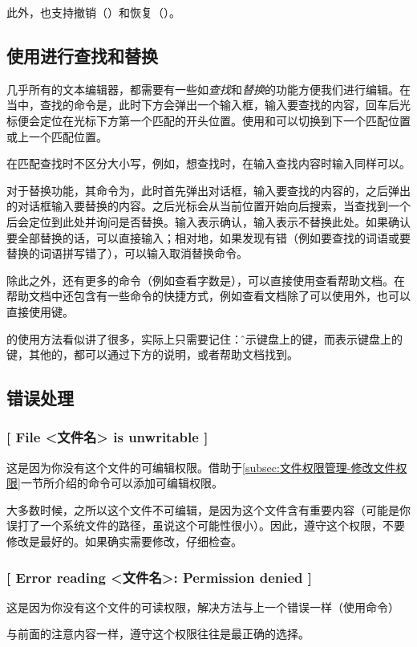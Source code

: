 此外，也支持撤销（）和恢复（）。

\subsection{使用进行查找和替换}

几乎所有的文本编辑器，都需要有一些如\emph{查找}和\emph{替换}的功能方便我们进行编辑。在当中，查找的命令是，此时下方会弹出一个输入框，输入要查找的内容，回车后光标便会定位在光标下方第一个匹配的开头位置。使用和可以切换到下一个匹配位置或上一个匹配位置。

\begin{attention}
    在匹配查找时不区分大小写，例如，想查找时，在输入查找内容时输入同样可以。
\end{attention}

对于替换功能，其命令为，此时首先弹出对话框，输入要查找的内容的，之后弹出的对话框输入要替换的内容。之后光标会从当前位置开始向后搜索，当查找到一个后会定位到此处并询问是否替换。输入表示确认，输入表示不替换此处。如果确认要全部替换的话，可以直接输入；相对地，如果发现有错（例如要查找的词语或要替换的词语拼写错了），可以输入取消替换命令。

除此之外，还有更多的命令（例如查看字数是），可以直接使用查看帮助文档。在帮助文档中还包含有一些命令的快捷方式，例如查看文档除了可以使用外，也可以直接使用键。

\begin{attention}
    的使用方法看似讲了很多，实际上只需要记住：\^表示键盘上的键，而表示键盘上的键，其他的，都可以通过下方的说明，或者帮助文档找到。
\end{attention}

\subsection{错误处理}\label{subsec:使用nano简单创建文件-错误处理}

\subsubsection{[ File <文件名> is unwritable ]}

这是因为你没有这个文件的可编辑权限。借助于\ref{subsec:文件权限管理-修改文件权限}一节所介绍的命令可以添加可编辑权限。

\begin{attention}
    大多数时候，之所以这个文件不可编辑，是因为这个文件含有重要内容（可能是你误打了一个系统文件的路径，虽说这个可能性很小）。因此，遵守这个权限，不要修改是最好的。如果确实需要修改，仔细检查。
\end{attention}

\subsubsection{[ Error reading <文件名>: Permission denied ]}

这是因为你没有这个文件的可读权限，解决方法与上一个错误一样（使用命令）

与前面的注意内容一样，遵守这个权限往往是最正确的选择。